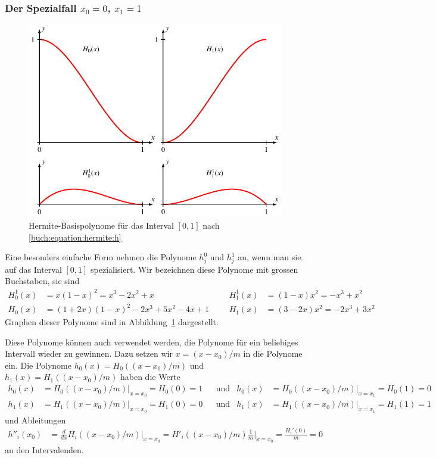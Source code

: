 \subsubsection{Der Spezialfall $x_0=0$, $x_1=1$}
\begin{figure}
\centering
\includegraphics{chapters/30-interpolation/figures/h.pdf}
\caption{Hermite-Basispolynome für das Interval $[0,1]$
nach \eqref{buch:equation:hermite:h}
\label{buch:figure:hermite:h}}
\end{figure}
Eine besonders einfache Form nehmen die Polynome $h_j^0$ und $h_j^1$ an,
wenn man sie auf das Interval $[0,1]$ spezialisiert.
Wir bezeichnen diese Polynome mit grossen Buchstaben, sie sind
\begin{equation}
\begin{aligned}
H_0^1(x) &= x(1-x)^2=x^3-2x^2+x
&&&
H_1^1(x) &= (1-x)x^2=-x^3+x^2
\\
H_0(x)   &= (1+2x)(1-x)^2 -2x^3+5x^2-4x+1
&&&
H_1(x)   &= (3-2x)x^2 = -2x^3+3x^2
\end{aligned}
\label{buch:equation:hermite:h}
\end{equation}
Graphen dieser Polynome sind in Abbildung~\ref{buch:figure:hermite:h}
dargestellt.

Diese Polynome können auch verwendet werden, die Polynome für ein
beliebiges Intervall wieder zu gewinnen.
Dazu setzen wir $x=(x-x_0)/m$ in die Polynome ein.
Die Polynome $h_0(x)=H_0((x-x_0)/m)$ und $h_1(x)=H_1((x-x_0)/m)$
haben die Werte
\[
\begin{aligned}
h_0(x)
&=
H_0((x-x_0)/m)\bigg|_{x=x_0}
=
H_0(0)=1
&&\text{und}&
h_0(x)
&=
H_0((x-x_0)/m)\bigg|_{x=x_1}
=
H_0(1)=0
\\
h_1(x)
&=
H_1((x-x_0)/m)\bigg|_{x=x_0}
=
H_1(0)=0
&&\text{und}&
h_1(x)
&=
H_1((x-x_0)/m)\bigg|_{x=x_1}
=
H_1(1)=1
\end{aligned}
\]
und Ableitungen
\begin{align*}
h''_i(x_0)
&=
\frac{d}{dx} H_i((x-x_0)/m)\bigg|_{x=x_0}
=
H'_i((x-x_0)/m) \frac{1}{m}\bigg|_{x=x_0}
=
\frac{H_i'(0)}{m} = 0
\end{align*}
an den Intervalenden.


